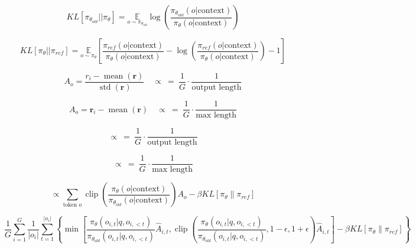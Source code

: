 \documentclass[11pt,letterpaper]{article}
\title{}
\author{}
\date{\today}
\begin{document}
\maketitle

\[
KL[\pi_{\theta_{old}} || \pi_{\theta}] = \underset{o \sim \pi_{\theta_{old}}}{\mathbb{E}} \log\left(\frac{\pi_{\theta_{old}}(o|\text{context})}{\pi_{\theta}(o|\text{context})}\right)
\]


\[
KL[\pi_{\theta} || \pi_{ref}] = \underset{o \sim \pi_{\theta}}{\mathbb{E}} \left[ \frac{\pi_{ref}(o|\text{context})}{\pi_{\theta}(o|\text{context})} - \log\left(\frac{\pi_{ref}(o|\text{context})}{\pi_{\theta}(o|\text{context})}\right) - 1 \right]
\]


\[
    A_o = \frac{r_i - \operatorname{mean}(\mathbf{r})}{\operatorname{std}(\mathbf{r})}
    \quad
    \propto\ =\ \frac{1}{G} \cdot \frac{1}{\text{output length}}
\]

\[
    A_o = \mathbf{r}_i - \operatorname{mean}(\mathbf{r}) 
    \quad
    \propto\ =\ \frac{1}{G} \cdot \frac{1}{\text{max length}}
\]

\[
    \propto\ =\ \frac{1}{G} \cdot \frac{1}{\text{output length}}
\]

\[
    \propto\ =\ \frac{1}{G} \cdot \frac{1}{\text{max length}}
\]

\[
\propto \sum_{\text{token } o} \operatorname{clip}\left(\frac{\pi_{\theta}(o|\text{context})}{\pi_{\theta_{old}}(o|\text{context})}\right) A_o - \beta KL[\pi_{\theta} \| \pi_{ref}]
\]

\begin{equation*}
\frac{1}{G} \sum_{i=1}^{G} \frac{1}{|o_i|} \sum_{t=1}^{|o_i|} \left\{ \min \left[ \frac{\pi_{\theta}(o_{i,t}|q, o_{i,<t})}{\pi_{\theta_{old}}(o_{i,t}|q, o_{i,<t})} \hat{A}_{i,t}, \operatorname{clip}\left(\frac{\pi_{\theta}(o_{i,t}|q, o_{i,<t})}{\pi_{\theta_{old}}(o_{i,t}|q, o_{i,<t})}, 1-\epsilon, 1+\epsilon\right) \hat{A}_{i,t} \right] - \beta KL[\pi_{\theta} \| \pi_{ref}] \right\}
\end{equation*}




\end{document}

